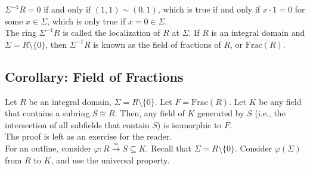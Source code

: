 \documentclass[8pt]{extarticle}
\begin{document}
  $\Sigma^{-1}R = 0$ if and only if $(1,1)\sim (0,1)$, which is true if and only if $x\cdot 1 = 0$ for some $x\in \Sigma$, which is only true if $x = 0\in \Sigma$.\\

  The ring $\Sigma^{-1}R$ is called the localization of $R$ at $\Sigma$. If $R$ is an integral domain and $\Sigma = R\setminus \{0\}$, then $\Sigma^{-1}R$ is known as the field of fractions of $R$, or $\text{Frac}(R)$.
  \subsection{Corollary: Field of Fractions}%
  Let $R$ be an integral domain, $\Sigma = R\setminus \{0\}$. Let $F = \text{Frac}(R)$. Let $K$ be any field that contains a subring $S\cong R$. Then, any field of $K$ generated by $S$ (i.e., the intersection of all subfields that contain $S$) is isomorphic to $F$.\\

  The proof is left as an exercise for the reader.\\

  For an outline, consider $\varphi: R\xrightarrow{\simeq} S\subseteq K$. Recall that $\Sigma = R\setminus \{0\}$. Consider $\varphi(\Sigma)$ from $R$ to $K$, and use the universal property.
\end{document}
